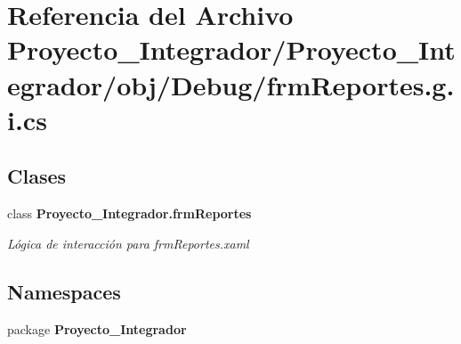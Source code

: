 \section{Referencia del Archivo Proyecto\-\_\-\-Integrador/\-Proyecto\-\_\-\-Integrador/obj/\-Debug/frm\-Reportes.g.\-i.\-cs}
\label{frm_reportes_8g_8i_8cs}
\subsection*{Clases}
\begin{DoxyCompactItemize}
\item 
class {\bf Proyecto\-\_\-\-Integrador.\-frm\-Reportes}
\begin{DoxyCompactList}\small\item\em Lógica de interacción para frm\-Reportes.\-xaml \end{DoxyCompactList}\end{DoxyCompactItemize}
\subsection*{Namespaces}
\begin{DoxyCompactItemize}
\item 
package {\bf Proyecto\-\_\-\-Integrador}
\end{DoxyCompactItemize}
